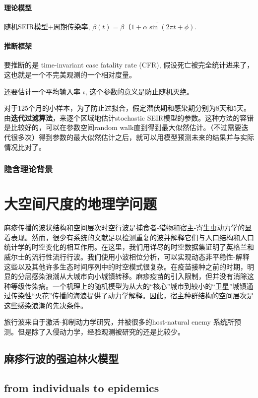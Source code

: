 \paragraph{理论模型}

随机SEIR模型+周期传染率, $\beta(t) = \bar{\beta（1 + \alpha \sin(2\pi t +\phi)}$. 

\paragraph{推断框架}

要推断的是 time-invariant case fatality rate (CFR), 假设死亡被完全统计进来了，这也就是一个不完美观测的一个相对度量。

还要估计一个平均输入率 $\iota$, 这个参数的意义是防止随机灭绝。

对于125个月的小样本，为了防止过拟合，假定潜伏期和感染期分别为8天和5天。由\textbf{迭代过滤算法}，来逐个区域地估计stochastic SEIR模型的参数。这种方法的容错是比较好的，可以在参数空间random walk直到得到最大似然估计。（不过需要迭代很多次）得到参数的最大似然估计之后，就可以用模型预测未来的结果并与实际情况比对了。

\subsubsection{隐含理论背景}



\section{大空间尺度的地理学问题}

\href{https://www.nature.com/articles/414716a.pdf}{麻疹传播的波状结构和空间层次}时空行波是捕食者-猎物和宿主-寄生虫动力学的显着表现。然而，很少有系统的文献足以检测重复的波并解释它们与人口结构和人口统计学的时空变化的相互作用。在这里，我们用详尽的时空数据集证明了英格兰和威尔士的流行性流行行波。我们使用小波相位分析，可以实现动态非平稳性-解释这些以及其他许多生态时间序列中的时空模式很复杂。在疫苗接种之前的时期，明显的分层感染浪潮从大城市向小城镇转移。麻疹疫苗的引入限制，但并没有消除这种等级传染病。一个机理上的随机模型为从大的“核心”城市到较小的“卫星”城镇通过传染性“火花”传播的海浪提供了动力学解释。因此，宿主种群结构的空间层次是这些感染浪潮的先决条件。

旅行波来自于激活-抑制动力学研究，并被很多的host-natural enemy 系统所预测。但是除了入侵动力学，经验观测被研究的还是比较少。

\subsection{麻疹行波的强迫林火模型}



\subsection{from individuals to epidemics}
